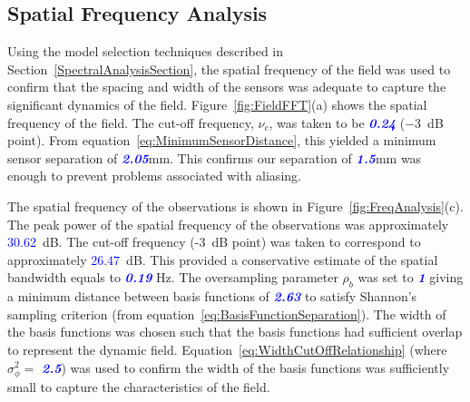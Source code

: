 \documentclass[twocolumn,11pt,a4paper]{article}		%
\newcommand{\parham}[1]{\textsf{\emph{\textbf{\textcolor{blue}{#1}}}}}
\begin{document}
\subsection{Spatial Frequency Analysis} 
Using the model selection techniques described in Section~\ref{SpectralAnalysisSection}, the spatial frequency of the field was used to confirm that the spacing and width of the sensors was adequate to capture the significant dynamics of the field. Figure~\ref{fig:FieldFFT}(a) shows the spatial frequency of the field. The cut-off frequency, $\nu_c$, was taken to be \parham{0.24} ($-3$~dB point). From equation~\ref{eq:MinimumSensorDistance}, this yielded a minimum sensor separation of \parham{2.05}mm. This confirms our separation of \parham{1.5}mm was enough to prevent problems associated with aliasing.

The spatial frequency of the observations is shown in Figure~\ref{fig:FreqAnalysis}(c). The peak power of the spatial frequency of the observations was approximately \parham{$30.62$}~dB. The cut-off frequency (-3~dB point) was taken to correspond to  approximately \parham{$26.47$}~dB. This provided a conservative estimate of the spatial bandwidth equals to \parham{0.19} Hz. The oversampling parameter $\rho_b$ was set to \parham{1} giving a minimum distance between basis functions of \parham{2.63} to satisfy Shannon's sampling criterion (from equation~\ref{eq:BasisFunctionSeparation}). The width of the basis functions was chosen such that the basis functions had sufficient overlap to represent the dynamic field. Equation~\ref{eq:WidthCutOffRelationship} (where $\sigma_{\phi}^2 = $ \parham{2.5}) was used to confirm the width of the basis functions was sufficiently small to capture the characteristics of the field.
\end{document}
